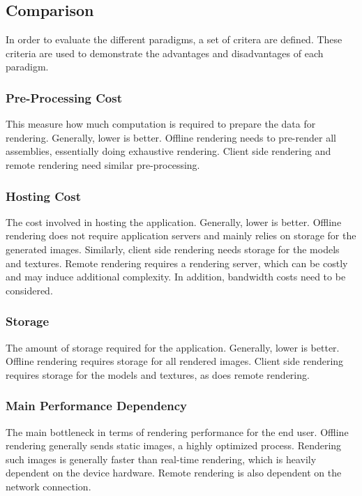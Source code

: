 \subsection*{Comparison}

In order to evaluate the different paradigms, a set of critera are defined. These criteria are used to demonstrate the advantages and disadvantages of each paradigm.

\subsubsection{Pre-Processing Cost}

This measure how much computation is required to prepare the data for rendering. Generally, lower is better. Offline rendering needs to pre-render all assemblies, essentially doing exhaustive rendering. Client side rendering and remote rendering need similar pre-processing.

\subsubsection{Hosting Cost}

The cost involved in hosting the application. Generally, lower is better. Offline rendering does not require application servers and mainly relies on storage for the generated images. Similarly, client side rendering needs storage for the models and textures. Remote rendering requires a rendering server, which can be costly and may induce additional complexity. In addition, bandwidth costs need to be considered.

\subsubsection{Storage}

The amount of storage required for the application. Generally, lower is better. Offline rendering requires storage for all rendered images. Client side rendering requires storage for the models and textures, as does remote rendering.

\subsubsection{Main Performance Dependency}

The main bottleneck in terms of rendering performance for the end user. Offline rendering generally sends static images, a highly optimized process. Rendering such images is generally faster than real-time rendering, which is heavily dependent on the device hardware. Remote rendering is also dependent on the network connection.

